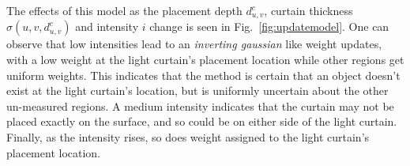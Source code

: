 The effects of this model as the placement depth $d^c_{u, v}$, curtain thickness $\sigma(u, v, d^c_{u, v})$ and intensity $i$ change is seen in Fig.~\ref{fig:updatemodel}. One can observe that low intensities lead to an \textit{inverting gaussian} like weight updates, with a low weight at the light curtain's placement location while other regions get uniform weights. This indicates that the method is certain that an object doesn't exist at the light curtain's location, but is uniformly uncertain about the other un-measured regions. A medium intensity indicates that the curtain may not be placed exactly on the surface, and so could be on either side of the light curtain. Finally, as the intensity rises, so does weight assigned to the light curtain's placement location.